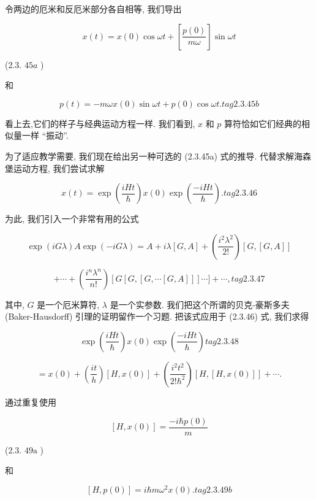 \documentclass[lang=cn,newtx,10pt,scheme=chinese,thmcnt=section]{elegantbook}
\begin{document}
令两边的厄米和反厄米部分各自相等, 我们导出

$$
x\left( t\right) = x\left( 0\right) \cos {\omega t} + \left\lbrack \frac{p\left( 0\right) }{m\omega }\right\rbrack \sin {\omega t}
$$

(2.3. ${45a}$ )

和

$$
p\left( t\right) = - {m\omega x}\left( 0\right) \sin {\omega t} + p\left( 0\right) \cos {\omega t}. tag{2.3.45b}
$$

看上去,它们的样子与经典运动方程一样. 我们看到, $x$ 和 $p$ 算符恰如它们经典的相似量一样 “振动”.

为了适应教学需要, 我们现在给出另一种可选的 (2.3.45a) 式的推导. 代替求解海森堡运动方程, 我们尝试求解

$$
x\left( t\right) = \exp \left( \frac{iHt}{\hbar }\right) x\left( 0\right) \exp \left( \frac{-{iHt}}{\hbar }\right) . tag{2.3.46}
$$

为此, 我们引入一个非常有用的公式

$$
\exp \left( {iG\lambda }\right) A\exp \left( {-{iG\lambda }}\right) = A + {i\lambda }\left\lbrack {G, A}\right\rbrack + \left( \frac{{i}^{2}{\lambda }^{2}}{2!}\right) \left\lbrack {G,\left\lbrack {G, A}\right\rbrack }\right\rbrack
$$

$$
+ \cdots + \left( \frac{{i}^{n}{\lambda }^{n}}{n!}\right) \left\lbrack {G\left\lbrack {G,\left\lbrack {G,\cdots \left\lbrack {G, A}\right\rbrack }\right\rbrack }\right\rbrack \cdots \rbrack + \cdots ,}\right. tag{2.3.47}
$$

其中, $G$ 是一个厄米算符, $\lambda$ 是一个实参数. 我们把这个所谓的贝克-豪斯多夫 (Baker-Hausdorff) 引理的证明留作一个习题. 把该式应用于 (2.3.46) 式, 我们求得

$$
\exp \left( \frac{iHt}{\hbar }\right) x\left( 0\right) \exp \left( \frac{-{iHt}}{\hbar }\right) tag{2.3.48}
$$

$$
= x\left( 0\right) + \left( \frac{it}{h}\right) \left\lbrack {H, x\left( 0\right) }\right\rbrack + \left( \frac{{i}^{2}{t}^{2}}{2!{\hbar }^{2}}\right) \left\lbrack {H,\left\lbrack {H, x\left( 0\right) }\right\rbrack }\right\rbrack + \cdots .
$$

通过重复使用

$$
\left\lbrack {H, x\left( 0\right) }\right\rbrack = \frac{-i\hbar p\left( 0\right) }{m}
$$

(2.3. ${49}\mathrm{a}$ )

和

$$
\left\lbrack {H, p\left( 0\right) }\right\rbrack = i\hbar m{\omega }^{2}x\left( 0\right) . tag{2.3.49b}
$$
\end{document}
